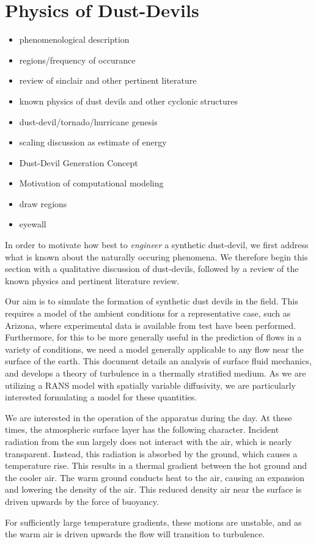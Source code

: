 \section{Physics of Dust-Devils}
\label{sec:physics}
\begin{itemize}
\item phenomenological description
\item regions/frequency of occurance
\item review of sinclair and other pertinent literature
\item known physics of dust devils and other cyclonic structures
\item dust-devil/tornado/hurricane genesis
\item scaling discussion as estimate of energy
\item Dust-Devil Generation Concept
\item Motivation of computational modeling
\item draw regions
\item eyewall
\end{itemize}

In order to motivate how best to \textit{engineer} a synthetic
dust-devil, we first address what is known about the naturally occuring
phenomena. We therefore begin this section with a qualitative discussion
of dust-devils, followed by a review of the known physics and pertinent 
literature review. 

Our aim is to simulate the formation of synthetic dust devils in the
field. This requires a model of the ambient conditions for a
representative case, such as Arizona, where experimental data is
available from test have been performed. Furthermore, for this to be
more generally useful in the prediction of flows in a variety of
conditions, we need a model generally applicable to any flow near the
surface of the earth.  
%
%
This document details an analysis of surface fluid mechanics, and
develops a theory of turbulence in a thermally stratified medium. As we
are utilizing a RANS model with spatially variable diffusivity, we are
particularly interested formulating a model for these quantities. 

We are interested in the operation of the apparatus during the day. 
At these times, the atmospheric surface layer has the following character. 
Incident radiation from the sun largely does not interact with the
air, which is nearly transparent. Instead, this radiation is absorbed by
the ground, which causes a temperature rise. This results in a thermal
gradient between the hot ground and the cooler air. The warm ground
conducts heat to the air, causing an expansion and lowering the density
of the air. This reduced density air near the surface is driven upwards
by the force of buoyancy.  

For sufficiently large temperature gradients, these motions are
unstable, and as the warm air is driven upwards the flow will transition
to turbulence. 
